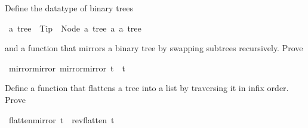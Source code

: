 %
\begin{isabellebody}%
\def\isabellecontext{Tree}%
%
\begin{isamarkuptext}%
\noindent
Define the datatype of binary trees%
\end{isamarkuptext}%
\ {\isacharprime}a\ tree\ {\isacharequal}\ Tip\ {\isacharbar}\ Node\ {\isachardoublequote}{\isacharprime}a\ tree{\isachardoublequote}\ {\isacharprime}a\ {\isachardoublequote}{\isacharprime}a\ tree{\isachardoublequote}%
\begin{isamarkuptext}%
\noindent
and a function  that mirrors a binary tree
by swapping subtrees recursively. Prove%
\end{isamarkuptext}%
\ mirror{\isacharunderscore}mirror{\isacharcolon}\ {\isachardoublequote}mirror{\isacharparenleft}mirror\ t{\isacharparenright}\ {\isacharequal}\ t{\isachardoublequote}%
\begin{isamarkuptext}%
\noindent
Define a function  that flattens a tree into a list
by traversing it in infix order. Prove%
\end{isamarkuptext}%
\ {\isachardoublequote}flatten{\isacharparenleft}mirror\ t{\isacharparenright}\ {\isacharequal}\ rev{\isacharparenleft}flatten\ t{\isacharparenright}{\isachardoublequote}\end{isabellebody}%
